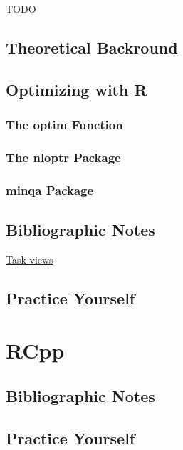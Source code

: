 \documentclass[]{book}
\theoremstyle{definition}
\theoremstyle{definition}
\theoremstyle{definition}
\theoremstyle{remark}
\begin{document}
TODO

\section{Theoretical Backround}\label{theoretical-backround}

\section{Optimizing with R}\label{optimizing-with-r}

\subsection{The optim Function}\label{the-optim-function}

\subsection{The nloptr Package}\label{the-nloptr-package}

\subsection{minqa Package}\label{minqa-package}

\section{Bibliographic Notes}\label{bibliographic-notes-16}

\href{https://cran.r-project.org/web/views/Optimization.html}{Task
views}

\section{Practice Yourself}\label{practice-yourself-14}

\chapter{RCpp}\label{rcpp}

\section{Bibliographic Notes}\label{bibliographic-notes-17}

\section{Practice Yourself}\label{practice-yourself-15}
\end{document}
